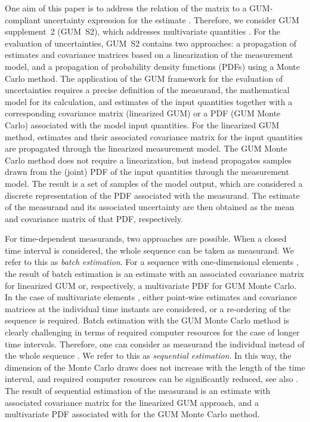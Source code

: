 \documentclass[10pt]{article}
\begin{document}
\begin{spacing}{1}
One aim of this paper is to address the relation of the matrix  to a GUM-compliant uncertainty expression for the estimate . Therefore, we consider GUM supplement~2 (GUM~S2), which addresses multivariate quantities \cite{GUMS2}. For the evaluation of uncertainties, GUM~S2 contains two approaches: a propagation of estimates and covariance matrices based on a linearization of the measurement model, and a propagation of probability density functions (PDFs) using a Monte Carlo method. The application of the GUM framework for the evaluation of uncertainties requires a precise definition of the measurand, the mathematical model for its calculation, and estimates of the input quantities together with a corresponding covariance matrix (linearized GUM) or a PDF (GUM Monte Carlo) associated with the model input quantities. For the linearized GUM method, estimates and their associated covariance matrix for  the input quantities are propagated through the linearized measurement model. The GUM Monte Carlo method does not require a linearization, but instead propagates samples drawn from the (joint) PDF of the input quantities through the measurement model. The result is a set of samples of the model output, which are considered a discrete representation of the PDF associated with the measurand. The estimate of the measurand and its associated uncertainty are then obtained as the mean and covariance matrix of that PDF, respectively.

For time-dependent measurands, two approaches are possible. When a closed time interval is considered, the whole sequence  can be taken as measurand. We refer to this as \emph{batch estimation}. For a sequence with one-dimensional elements , the result of batch estimation is an estimate  with an associated covariance matrix for linearized GUM or, respectively, a multivariate PDF for GUM Monte Carlo. In the case of multivariate elements , either point-wise estimates and covariance matrices at the individual time instants are considered, or a re-ordering of the sequence is required.
Batch estimation with the GUM Monte Carlo method is clearly challenging in terms of required computer resources for the case of longer time intervals. Therefore, one can consider as measurand the individual  instead of the whole sequence . We refer to this as \emph{sequential estimation}. In this way, the dimension of the Monte Carlo draws does not increase with the length of the time interval, and required computer resources can be significantly reduced, see also \cite{Eichstadt2012, Eichstadt2012Diss}. The result of sequential estimation of the measurand  is an estimate  with associated covariance matrix  for the linearized GUM approach, and a multivariate PDF associated with  for the GUM Monte Carlo method.



\end{spacing}
\end{document}
